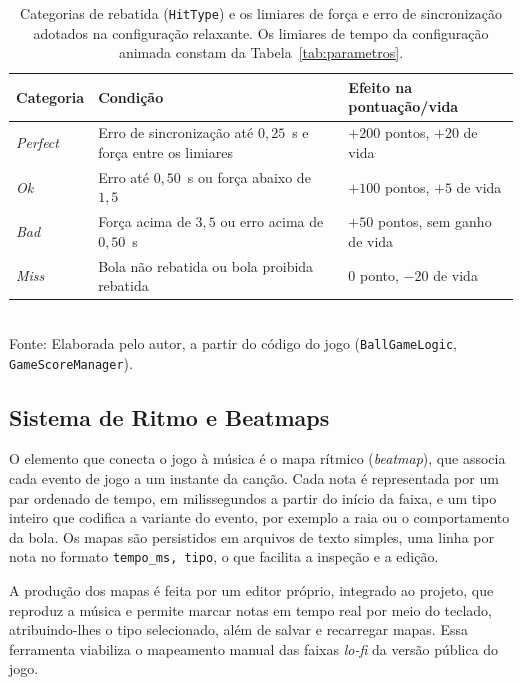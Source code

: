 \begin{table}[H]
    \centering
    \caption{Categorias de rebatida (\texttt{HitType}) e os limiares de força e erro de sincronização adotados na configuração relaxante. Os limiares de tempo da configuração animada constam da Tabela~\ref{tab:parametros}.}
    \label{tab:hittype}
    \small
    \begin{tabularx}{\textwidth}{p{2.2cm}Xp{3.2cm}}
        \toprule
        Categoria & Condição & Efeito na pontuação/vida \\
        \midrule
        \textit{Perfect} & Erro de sincronização até $0{,}25$~s e força entre os limiares & $+200$ pontos, $+20$ de vida \\
        \textit{Ok}      & Erro até $0{,}50$~s ou força abaixo de $1{,}5$ & $+100$ pontos, $+5$ de vida \\
        \textit{Bad}     & Força acima de $3{,}5$ ou erro acima de $0{,}50$~s & $+50$ pontos, sem ganho de vida \\
        \textit{Miss}    & Bola não rebatida ou bola proibida rebatida & $0$ ponto, $-20$ de vida \\
        \bottomrule
    \end{tabularx}\\[2pt]
    {\footnotesize Fonte: Elaborada pelo autor, a partir do código do jogo (\texttt{BallGameLogic}, \texttt{GameScoreManager}).}
\end{table}

\subsection{Sistema de Ritmo e Beatmaps}\label{subsec:beatmaps}

O elemento que conecta o jogo à música é o mapa rítmico (\textit{beatmap}), que associa cada evento de jogo a um instante da canção. Cada nota é representada por um par ordenado de tempo, em milissegundos a partir do início da faixa, e um tipo inteiro que codifica a variante do evento, por exemplo a raia ou o comportamento da bola. Os mapas são persistidos em arquivos de texto simples, uma linha por nota no formato \texttt{tempo\_ms, tipo}, o que facilita a inspeção e a edição.

A produção dos mapas é feita por um editor próprio, integrado ao projeto, que reproduz a música e permite marcar notas em tempo real por meio do teclado, atribuindo-lhes o tipo selecionado, além de salvar e recarregar mapas. Essa ferramenta viabiliza o mapeamento manual das faixas \textit{lo-fi} da versão pública do jogo.

